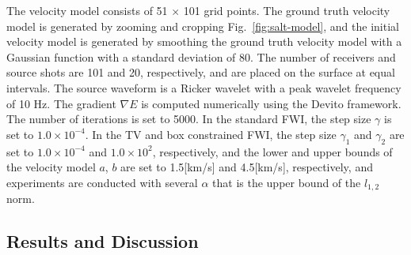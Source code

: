 The velocity model consists of 51 $\times$ 101 grid points.
The ground truth velocity model is generated by zooming and cropping Fig.~\ref{fig:salt-model}, and the initial velocity model is generated by smoothing the ground truth velocity model with a Gaussian function with a standard deviation of 80.
The number of receivers and source shots are 101 and 20, respectively, and are placed on the surface at equal intervals.
The source waveform is a Ricker wavelet with a peak wavelet frequency of 10 Hz.
The gradient $\nabla E$ is computed numerically using the Devito framework\cite{devito}.
The number of iterations is set to 5000.
In the standard FWI, the step size $\gamma$ is set to $1.0 \times 10^{-4}$.
In the TV and box constrained FWI, the step size $\gamma_1$ and $\gamma_2$ are set to $1.0 \times 10^{-4}$ and $1.0 \times 10^2$, respectively,
    and the lower and upper bounds of the velocity model $a$, $b$ are set to 1.5[km/s] and 4.5[km/s], respectively,
    and experiments are conducted with several $\alpha$ that is the upper bound of the $l_{1,2}$ norm.


\subsection{Results and Discussion}\label{subsec:results-and-discussion}


